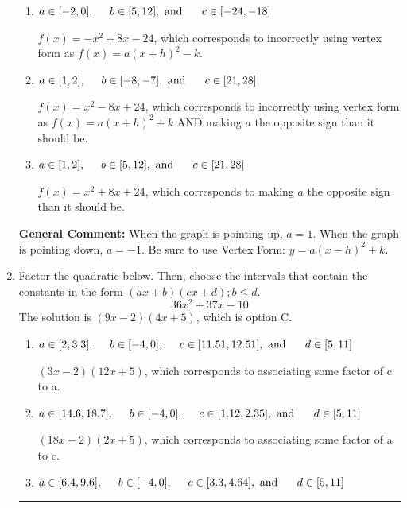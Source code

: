 \documentclass{extbook}[14pt]
\newcommand{\litem}[1]{\item #1

\rule{\textwidth}{0.4pt}}
\begin{document}
\begin{enumerate}
{\begin{enumerate}[label=\Alph*.]
* $f(x)=-x^{2} -8 x -8$, which is the correct option.
\item \( a \in [-2, 0], \hspace*{5mm} b \in [5, 12], \text{ and } \hspace*{5mm} c \in [-24, -18] \)

$f(x)=-x^{2} +8 x -24$, which corresponds to incorrectly using vertex form as $f(x) = a(x+h)^2 - k$.
\item \( a \in [1, 2], \hspace*{5mm} b \in [-8, -7], \text{ and } \hspace*{5mm} c \in [21, 28] \)

$f(x)=x^{2} -8 x + 24$, which corresponds to incorrectly using vertex form as $f(x) = a(x+h)^2+k$ AND making $a$ the opposite sign than it should be.
\item \( a \in [1, 2], \hspace*{5mm} b \in [5, 12], \text{ and } \hspace*{5mm} c \in [21, 28] \)

$f(x)=x^{2} +8 x + 24$, which corresponds to making $a$ the opposite sign than it should be.
\end{enumerate}

\textbf{General Comment:} When the graph is pointing up, $a=1$. When the graph is pointing down, $a=-1$. Be sure to use Vertex Form: $y = a(x-h)^2+k$.
}
\litem{
Factor the quadratic below. Then, choose the intervals that contain the constants in the form $(ax+b)(cx+d); b \leq d.$
\[ 36x^{2} +37 x -10 \]The solution is \( (9x -2)(4x + 5) \), which is option C.\begin{enumerate}[label=\Alph*.]
\item \( a \in [2, 3.3], \hspace*{5mm} b \in [-4, 0], \hspace*{5mm} c \in [11.51, 12.51], \text{ and } \hspace*{5mm} d \in [5, 11] \)

 $(3x -2)(12x + 5)$, which corresponds to associating some factor of c to a.
\item \( a \in [14.6, 18.7], \hspace*{5mm} b \in [-4, 0], \hspace*{5mm} c \in [1.12, 2.35], \text{ and } \hspace*{5mm} d \in [5, 11] \)

 $(18x -2)(2x + 5)$, which corresponds to associating some factor of a to c.
\item \( a \in [6.4, 9.6], \hspace*{5mm} b \in [-4, 0], \hspace*{5mm} c \in [3.3, 4.64], \text{ and } \hspace*{5mm} d \in [5, 11] \)


\end{enumerate}}
\end{enumerate}
\end{document}
